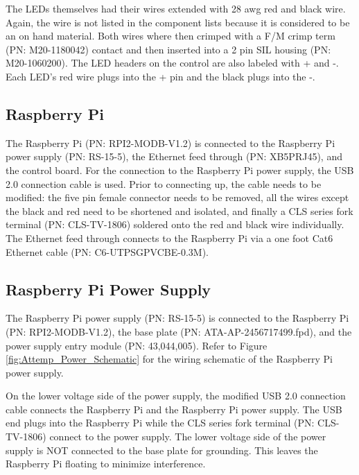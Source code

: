 \documentclass[12pt,a4paper,oneside]{article}
\begin{document}
The LEDs themselves had their wires extended with 28 awg red and black wire. Again, the wire is not listed in the component lists because it is considered to be an on hand material. Both wires where then crimped with a F/M crimp term (PN: M20-1180042) contact and then inserted into a 2 pin SIL housing (PN: M20-1060200). The LED headers on the control are also labeled with + and -. Each LED's red wire plugs into the + pin and the black plugs into the -.

\subsection{Raspberry Pi}
\label{sec:6.3}

The Raspberry Pi (PN: RPI2-MODB-V1.2) is connected to the Raspberry Pi power supply (PN: 	RS-15-5), the Ethernet feed through (PN: XB5PRJ45), and the control board. For the connection to the Raspberry Pi power supply, the USB 2.0 connection cable is used. Prior to connecting up, the cable needs to be modified: the five pin female connector needs to be removed, all the wires except the black and red need to be shortened and isolated, and finally a CLS series fork terminal (PN: CLS-TV-1806) soldered onto the red and black wire individually. The Ethernet feed through connects to the Raspberry Pi via a one foot Cat6 Ethernet cable (PN: C6-UTPSGPVCBE-0.3M). 

\subsection{Raspberry Pi Power Supply}
\label{sec:6.4}

The Raspberry Pi power supply (PN: RS-15-5) is connected to the Raspberry Pi (PN: RPI2-MODB-V1.2), the base plate (PN: ATA-AP-2456717499.fpd), and the power supply entry module (PN: 43,044,005). Refer to Figure \ref{fig:Attemp_Power_Schematic} for the wiring schematic of the Raspberry Pi power supply. 

On the lower voltage side of the power supply, the modified USB 2.0 connection cable connects the Raspberry Pi and the Raspberry Pi power supply. The USB end plugs into the Raspberry Pi while the CLS series fork terminal (PN: CLS-TV-1806) connect to the power supply. The lower voltage side of the power supply is NOT connected to the base plate for grounding. This leaves the Raspberry Pi floating to minimize interference.
\end{document}
